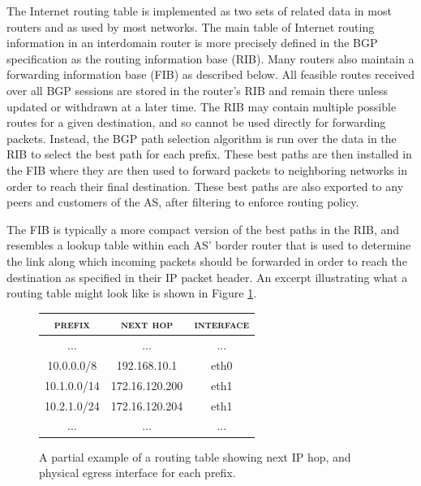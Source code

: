 The Internet routing table is implemented as two sets of related data in most
routers and as used by most networks. The main table of Internet routing
information in an interdomain router is more precisely defined in the BGP
specification \cite{rfc4271} as the routing information base (RIB). Many
routers also maintain a forwarding information base (FIB) as described below.
All feasible routes received over all BGP sessions are stored in the router's
RIB and remain there unless updated or withdrawn at a later time. The RIB may
contain multiple possible routes for a given destination, and so cannot be used
directly for forwarding packets. Instead, the BGP path selection algorithm is
run over the data in the RIB to select the best path for each prefix. These
best paths are then installed in the FIB where they are then used to forward
packets to neighboring networks in order to reach their final destination.
These best paths are also exported to any peers and customers of the AS, after
filtering to enforce routing policy.

The FIB is typically a more compact version of the best paths in the RIB, and
resembles a lookup table within each AS' border router that is used to
determine the link along which incoming packets should be forwarded in order to
reach the destination as specified in their IP packet header. An excerpt
illustrating what a routing table might look like is shown in Figure
\ref{fig:ex_routing_table}.

\begin{figure}[h!]
    \begin{center}
    \begin{singlespace}
    \small
        \begin{tabular}{c | c | c}
            \textsc{prefix} & \textsc{next hop} & \textsc{interface} \\
            \hline
            ... & ... & ... \\
            10.0.0.0/8  & 192.168.10.1   & eth0 \\
            10.1.0.0/14 & 172.16.120.200 & eth1 \\
            10.2.1.0/24 & 172.16.120.204 & eth1 \\
            ... & ... & ...
        \end{tabular}
    \end{singlespace}
    \end{center}
\caption[A partial example of a routing table]{A partial example of a routing
table showing next IP hop, and physical egress interface for each prefix.}
\label{fig:ex_routing_table}
\end{figure}

